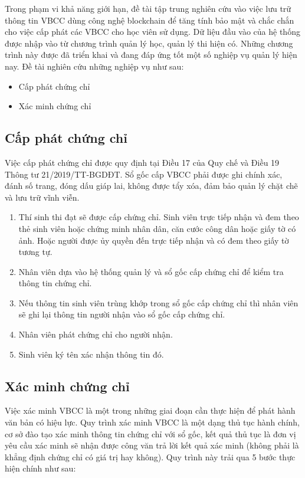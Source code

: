 Trong phạm vi khả năng giới hạn, đề tài tập trung nghiên cứu vào việc lưu trữ thông tin VBCC dùng công nghệ blockchain để tăng tính bảo mật và chắc chắn cho việc cấp phát các VBCC cho học viên sử dụng. Dữ liệu đầu vào của hệ thống được nhập vào từ chương trình quản lý học, quản lý thi hiện có. Những chương trình này được đã triển khai và đang đáp ứng tốt một số nghiệp vụ quản lý hiện nay. Đề tài nghiên cứu những nghiệp vụ như sau:

\begin{itemize}
\item Cấp phát chứng chỉ
\item Xác minh chứng chỉ
\end{itemize}

\subsection{Cấp phát chứng chỉ}

Việc cấp phát chứng chỉ được quy định tại Điều 17 của Quy chế và Điều 19 Thông tư 21/2019/TT-BGDĐT. Sổ gốc cấp VBCC phải được ghi chính xác, đánh số trang, đóng dấu giáp lai, không được tẩy xóa, đảm bảo quản lý chặt chẽ và lưu trữ vĩnh viễn.

\begin{enumerate}
\item Thí sinh thi đạt sẽ được cấp chứng chỉ. Sinh viên trực tiếp nhận và đem theo thẻ sinh viên hoặc chứng minh nhân dân, căn cước công dân hoặc giấy tờ có ảnh. Hoặc người được ủy quyền đến trực tiếp nhận và có đem theo giấy tờ tương tự.
\item Nhân viên dựa vào hệ thống quản lý và sổ gốc cấp chứng chỉ để kiểm tra thông tin chứng chỉ.
\item Nếu thông tin sinh viên trùng khớp trong sổ gốc cấp chứng chỉ thì nhân viên sẽ ghi lại thông tin người nhận vào sổ gốc cấp chứng chỉ.
\item Nhân viên phát chứng chỉ cho người nhận.
\item Sinh viên ký tên xác nhận thông tin đó.
\end{enumerate}

\subsection{Xác minh chứng chỉ}

Việc xác minh VBCC là một trong những giai đoạn cần thực hiện để phát hành văn bản có hiệu lực. Quy trình xác minh VBCC là một dạng thủ tục hành chính, cơ sở đào tạo xác minh thông tin chứng chỉ với sổ gốc, kết quả thủ tục là đơn vị yêu cầu xác minh sẽ nhận được công văn trả lời kết quả xác minh (không phải là khẳng định chứng chỉ có giá trị hay không). Quy trình này trải qua 5 bước thực hiện chính như sau:

